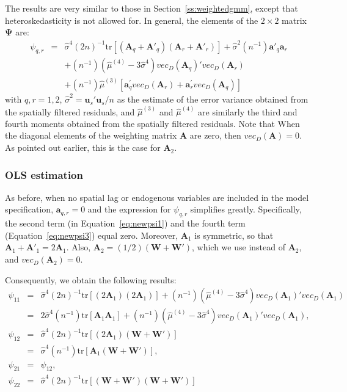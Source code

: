 \documentclass{article}
\begin{document}
The results are very similar to those in Section~\ref{ss:weightedgmm}, except that 
heteroskedasticity is not allowed for. In general, the elements of the $2 \times 2$ matrix $\mathbf{\Psi}$ are:
\begin{eqnarray}
\psi_{q,r} &=& \hat{\sigma}^4 (2n)^{-1} \mbox{tr} [ (\mathbf{A}_q + \mathbf{A'}_q )  (\mathbf{A}_r + \mathbf{A'}_r )] + \hat{\sigma}^2 (n^{-1}) \mathbf{a'}_q \mathbf{a}_r \label{eq:newpsi1}\\
&& + (n^{-1}) (\hat{\mu}^{(4)} - 3 \hat{\sigma}^4) vec_D(\mathbf{A}_q)'vec_D (\mathbf{A}_r)  \label{eq:newpsi2}\\
&& + (n^{-1}) \hat{\mu}^{(3)} [ \mathbf{a}_q^{'} vec_D(\mathbf{A}_r) +  \mathbf{a}_r^{'} vec_D(\mathbf{A}_q) ] \label{eq:newpsi3}
\end{eqnarray}
with $q, r = 1, 2$, $\hat{\sigma}^2 = \mathbf{u}_s'\mathbf{u}_s / n$ as the 
estimate of the error variance obtained from the spatially filtered residuals,
and $\hat{\mu}^{(3)}$ and $\hat{\mu}^{(4)}$ are similarly the third and fourth moments
obtained from the spatially filtered residuals. Note that When the diagonal elements of the weighting matrix $\mathbf{A}$ are zero, 
then  $vec_D (\mathbf{A}) = 0$. As pointed out earlier, this is the case for $\mathbf{A}_2$.




\subsubsection{OLS estimation}
As before, when no spatial lag or endogenous variables are included in the
model specification, $\mathbf{a}_{q,r} = 0$ and the expression for $\psi_{q,r}$ simplifies greatly.
Specifically, the second term (in Equation~\ref{eq:newpsi1}) and the fourth term (Equation~\ref{eq:newpsi3}) equal zero.
Moreover,
$\mathbf{A}_1$ is symmetric, so that $\mathbf{A}_1 + \mathbf{A'}_1 = 2 \mathbf{A}_1$.
Also, $\mathbf{A}_2 = (1/2) (\mathbf{W} + \mathbf{W'} )$, which we use instead of $\mathbf{A}_2$,
and $vec_D (\mathbf{A}_2) = 0$.

Consequently, we obtain the following results:
\begin{eqnarray*}
 \psi_{11} &=& \hat{\sigma}^4 (2n)^{-1} \mbox{tr} [ (2 \mathbf{A}_1 ) (2 \mathbf{A}_1 ) ]
               + (n^{-1}) (\hat{\mu}^{(4)} - 3 \hat{\sigma}^4) vec_D(\mathbf{A}_1)'vec_D (\mathbf{A}_1) \\
        &=&  2  \hat{\sigma}^4 (n^{-1}) \mbox{tr} [ \mathbf{A}_1\mathbf{A}_1 ]
       + (n^{-1}) (\hat{\mu}^{(4)} - 3 \hat{\sigma}^4) vec_D(\mathbf{A}_1)'vec_D (\mathbf{A}_1) ,\\
  \psi_{12} &=& \hat{\sigma}^4 (2n)^{-1} \mbox{tr} [ (2 \mathbf{A}_1 ) (\mathbf{W} + \mathbf{W'} ) ]\\
       &=& \hat{\sigma}^4 (n^{-1}) \mbox{tr} [  \mathbf{A}_1 (\mathbf{W} + \mathbf{W'} )  ],\\
   \psi_{21} &=& \psi_{12},\\
   \psi_{22} &=& \hat{\sigma}^4 (2n)^{-1} \mbox{tr} [ (\mathbf{W} + \mathbf{W'}) 
   (\mathbf{W} + \mathbf{W'}) ]
\end{eqnarray*}
\end{document}
